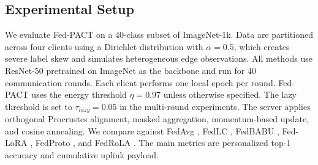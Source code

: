 \documentclass[conference]{IEEEtran}
\begin{document}
\subsection{Experimental Setup}
We evaluate Fed-PACT on a 40-class subset of ImageNet-1k. Data are partitioned across four clients using a Dirichlet distribution with $\alpha=0.5$, which creates severe label skew and simulates heterogeneous edge observations. All methods use ResNet-50 pretrained on ImageNet as the backbone and run for 40 communication rounds. Each client performs one local epoch per round.
Fed-PACT uses the energy threshold $\eta=0.97$ unless otherwise specified. The lazy threshold is set to $\tau_{lazy}=0.05$ in the multi-round experiments. The server applies orthogonal Procrustes alignment, masked aggregation, momentum-based update, and cosine annealing. We compare against FedAvg \cite{mcmahan2017fedavg}, FedLC \cite{zhang2022fedlc}, FedBABU \cite{oh2022fedbabu}, Fed-LoRA \cite{cho2023fedlora}, FedProto \cite{tan2022fedproto}, and FedRoLA \cite{yan2024fedrola}. The main metrics are personalized top-1 accuracy and cumulative uplink payload.
\end{document}

